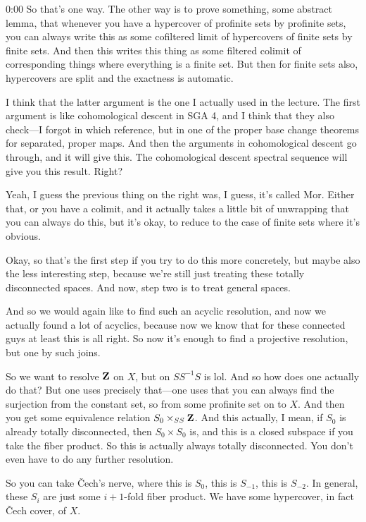 \begin{unfinished}{0:00}
So that's one way. The other way is to prove something, some abstract lemma, that whenever you have a hypercover of profinite sets by profinite sets, you can always write this as some cofiltered limit of hypercovers of finite sets by finite sets. And then this writes this thing as some filtered colimit of corresponding things where everything is a finite set. But then for finite sets also, hypercovers are split and the exactness is automatic.

I think that the latter argument is the one I actually used in the lecture. The first argument is like cohomological descent in SGA 4, and I think that they also check---I forgot in which reference, but in one of the proper base change theorems for separated, proper maps. And then the arguments in cohomological descent go through, and it will give this. The cohomological descent spectral sequence will give you this result. Right?

Yeah, I guess the previous thing on the right was, I guess, it's called Mor. Either that, or you have a colimit, and it actually takes a little bit of unwrapping that you can always do this, but it's okay, to reduce to the case of finite sets where it's obvious.

Okay, so that's the first step if you try to do this more concretely, but maybe also the less interesting step, because we're still just treating these totally disconnected spaces. And now, step two is to treat general spaces.

And so we would again like to find such an acyclic resolution, and now we actually found a lot of acyclics, because now we know that for these connected guys at least this is all right. So now it's enough to find a projective resolution, but one by such joins.

So we want to resolve $\mathbf Z$ on $X$, but on $SS^{-1}S$ is lol. And so how does one actually do that? But one uses precisely that---one uses that you can always find the surjection from the constant set, so from some profinite set on to $X$. And then you get some equivalence relation $S_0 \times_{SS} \mathbf Z$. And this actually, I mean, if $S_0$ is already totally disconnected, then $S_0 \times S_0$ is, and this is a closed subspace if you take the fiber product. So this is actually always totally disconnected. You don't even have to do any further resolution.

So you can take Čech's nerve, where this is $S_0$, this is $S_{-1}$, this is $S_{-2}$. In general, these $S_i$ are just some $i+1$-fold fiber product. We have some hypercover, in fact Čech cover, of $X$.


\end{unfinished}
